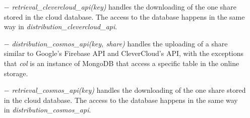 \documentclass[12pt, a4paper, oneside]{book}
\begin{document}
    \vspace{-0.5cm}
    \begin{itemize}
        \item[$-$] {\it retrieval\_clevercloud\_api(key)} handles the downloading of the one share stored in the cloud database. The access to the database happens in the same way in {\it distribution\_clevercloud\_api}.
    \end{itemize}
    
    \vspace{-0.5cm}
    \begin{itemize}
        \item[$-$] {\it distribution\_cosmos\_api(key, share)} handles the uploading of a share similar to Google's Firebase API and CleverCloud's API, with the exceptions that {\it col} is an instance of MongoDB that access a specific table in the online storage.
    \end{itemize}
    \vspace{-0.5cm}
    \begin{itemize}
        \item[$-$] {\it retrieval\_cosmos\_api(key)} handles the downloading of the one share stored in the cloud database. The access to the database happens in the same way in {\it distribution\_cosmos\_api}.
    \end{itemize}
    
\end{document}
